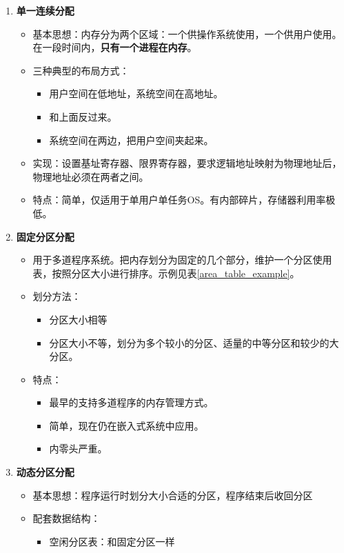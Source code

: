 \documentclass[12pt, a4paper, oneside]{ctexart}
\begin{document}
\begin{enumerate}
  \item {\bf 单一连续分配}
  \begin{itemize}
    \item 基本思想：内存分为两个区域：一个供操作系统使用，一个供用户使用。在一段时间内，\textbf{只有一个进程在内存}。
    \item 三种典型的布局方式：
    \begin{itemize}
      \item 用户空间在低地址，系统空间在高地址。
      \item 和上面反过来。
      \item 系统空间在两边，把用户空间夹起来。
    \end{itemize}
    \item 实现：设置基址寄存器、限界寄存器，要求逻辑地址映射为物理地址后，物理地址必须在两者之间。
    \item 特点：简单，仅适用于单用户单任务OS。有内部碎片，存储器利用率极低。
  \end{itemize}
  \item {\bf 固定分区分配}
  \begin{itemize}
    \item 用于多道程序系统。把内存划分为固定的几个部分，维护一个分区使用表，按照分区大小进行排序。示例见表\ref{area_table_example}。
    \item 划分方法：
    \begin{itemize}
      \item 分区大小相等
      \item 分区大小不等，划分为多个较小的分区、适量的中等分区和较少的大分区。
    \end{itemize}
    \item 特点：
    \begin{itemize}
      \item 最早的支持多道程序的内存管理方式。
      \item 简单，现在仍在嵌入式系统中应用。
      \item 内零头严重。
    \end{itemize}
  \end{itemize}
  \item {\bf 动态分区分配}
  \begin{itemize}
    \item 基本思想：程序运行时划分大小合适的分区，程序结束后收回分区
    \item 配套数据结构：
    \begin{itemize}
      \item 空闲分区表：和固定分区一样

\end{itemize}
\end{itemize}
\end{enumerate}
\end{document}

